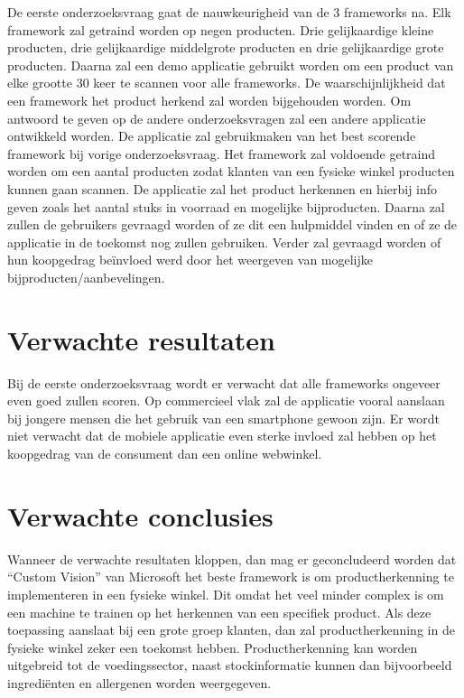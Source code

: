 De eerste onderzoeksvraag gaat de nauwkeurigheid van de 3 frameworks na. Elk framework zal getraind worden op negen producten. Drie gelijkaardige kleine producten, drie gelijkaardige middelgrote producten en drie gelijkaardige grote producten. Daarna zal een demo applicatie gebruikt worden om een product van elke grootte 30 keer te scannen voor alle frameworks. De waarschijnlijkheid dat een framework het product herkend zal worden bijgehouden worden. Om antwoord te geven op de andere onderzoeksvragen zal een andere applicatie ontwikkeld worden. De applicatie zal gebruikmaken van het best scorende framework bij vorige onderzoeksvraag. Het framework zal voldoende getraind worden om een aantal producten zodat klanten van een fysieke winkel producten kunnen gaan scannen. De applicatie zal het product herkennen en hierbij info geven zoals het aantal stuks in voorraad en mogelijke bijproducten. Daarna zal zullen de gebruikers gevraagd worden of ze dit een hulpmiddel vinden en of ze de applicatie in de toekomst nog zullen gebruiken. Verder zal gevraagd worden of hun koopgedrag beïnvloed werd door het weergeven van mogelijke bijproducten/aanbevelingen.  

\section{Verwachte resultaten}
\label{sec:verwachte_resultaten}

Bij de eerste onderzoeksvraag wordt er verwacht dat alle frameworks ongeveer even goed zullen scoren. Op commercieel vlak zal de applicatie vooral aanslaan bij jongere mensen die het gebruik van een smartphone gewoon zijn. Er wordt niet verwacht dat de mobiele applicatie even sterke invloed zal hebben op het koopgedrag van de consument dan een online webwinkel. 

\section{Verwachte conclusies}
\label{sec:verwachte_conclusies}

Wanneer de verwachte resultaten kloppen, dan mag er geconcludeerd worden dat “Custom Vision” van Microsoft het beste framework is om productherkenning te implementeren in een fysieke winkel. Dit omdat het veel minder complex is om een machine te trainen op het herkennen van een specifiek product. Als deze toepassing aanslaat bij een grote groep klanten, dan zal productherkenning in de fysieke winkel zeker een toekomst hebben. Productherkenning kan worden uitgebreid tot de voedingssector, naast stockinformatie kunnen dan bijvoorbeeld ingrediënten en allergenen worden weergegeven. 